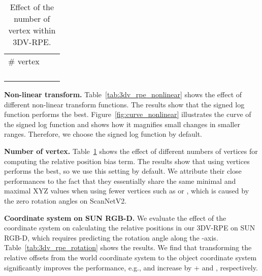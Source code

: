 \documentclass[10pt,twocolumn,letterpaper]{article}
\begin{document}
\begin{table}[t]
\begin{minipage}[t]{1\linewidth}
\vspace{2mm}
\centering
\setlength{\tabcolsep}{32pt}
\footnotesize
\renewcommand{\arraystretch}{1.35}
\resizebox{1.0\linewidth}{!}
{
\begin{tabular}{c|cc}
\# vertex  & &  \\
\shline
 &  &      \\
 &  &      \\
 &  &      \\
\rowcolor{gray!10} &  &      \\
\end{tabular}
}
\caption{\small{{
Effect of the number of vertex within 3DV-RPE.}}
}
\label{tab:3dv_rpe_num_vertex}
\end{minipage}
\end{table}

\noindent \textbf{Non-linear transform.}
Table~\ref{tab:3dv_rpe_nonlinear} shows the effect of different non-linear transform functions. The results show that the signed log function performs the best. Figure~\ref{fig:curve_nonlinear} illustrates the curve of the signed log function and shows how it magnifies small changes in smaller ranges.
Therefore, we choose the signed log function by default.


\vspace{1mm}
\noindent \textbf{Number of vertex.}
Table~\ref{tab:3dv_rpe_num_vertex} shows the effect of different numbers of vertices for computing the relative position bias term. The results show that using  vertices performs the best, so we use this setting by default.
We attribute their close performances to the fact that they essentially share the same minimal and maximal XYZ values when using fewer vertices such as  or , which is caused by the zero rotation angles on ScanNetV2.

\vspace{1mm}
\noindent \textbf{Coordinate system on SUN RGB-D.}
We evaluate the effect of the coordinate system on calculating the relative positions in our 3DV-RPE on SUN RGB-D, which requires predicting the rotation angle along the -axis. Table~\ref{tab:3dv_rpe_rotation} shows the results. We find that transforming the relative offsets from the world coordinate system to the object coordinate system significantly improves the performance, e.g.,  and  increase by + and , respectively.
\end{document}

